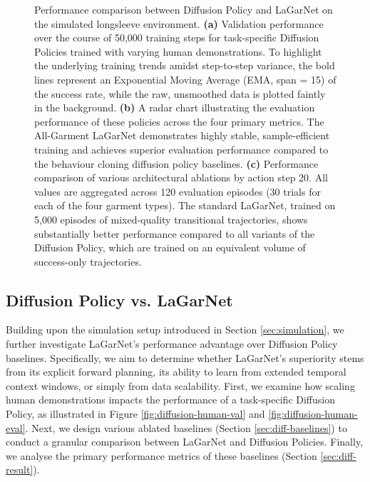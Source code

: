 \documentclass[journal]{IEEEtran}
\begin{document}
\begin{figure}[t!]
    \caption{Performance comparison between Diffusion Policy and LaGarNet on the simulated longsleeve environment. \textbf{(a)} Validation performance over the course of 50,000 training steps for task-specific Diffusion Policies trained with varying human demonstrations. To highlight the underlying training trends amidst step-to-step variance, the bold lines represent an Exponential Moving Average (EMA, span = 15) of the success rate, while the raw, unsmoothed data is plotted faintly in the background. \textbf{(b)} A radar chart illustrating the evaluation performance of these policies across the four primary metrics. The All-Garment LaGarNet demonstrates highly stable, sample-efficient training and achieves superior evaluation performance compared to the behaviour cloning diffusion policy baselines. \textbf{(c)} Performance comparison of various architectural ablations by action step 20. All values are aggregated across 120 evaluation episodes (30 trials for each of the four garment types). The standard LaGarNet, trained on 5,000 episodes of mixed-quality transitional trajectories, shows substantially better performance compared to all variants of the Diffusion Policy, which are trained on an equivalent volume of success-only trajectories.} 
    \label{fig:diff-vs-lagarnet-performance-combined}
\end{figure}





\subsection{Diffusion Policy vs. LaGarNet}  \label{sec:comp-diff}


Building upon the simulation setup introduced in Section \ref{sec:simulation}, we further investigate LaGarNet's performance advantage over Diffusion Policy baselines. Specifically, we aim to determine whether LaGarNet's superiority stems from its explicit forward planning, its ability to learn from extended temporal context windows, or simply from data scalability. First, we examine how scaling human demonstrations impacts the performance of a task-specific Diffusion Policy, as illustrated in Figure \ref{fig:diffusion-human-val} and \ref{fig:diffusion-human-eval}. Next, we design various ablated baselines (Section \ref{sec:diff-baselines}) to conduct a granular comparison between LaGarNet and Diffusion Policies. Finally, we analyse the primary performance metrics of these baselines (Section \ref{sec:diff-result}). 
\end{document}
